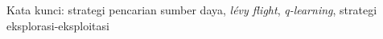 \lipsum[1]
Kata kunci:
strategi pencarian sumber daya, \textit{lévy flight}, \textit{q-learning}, strategi eksplorasi-eksploitasi